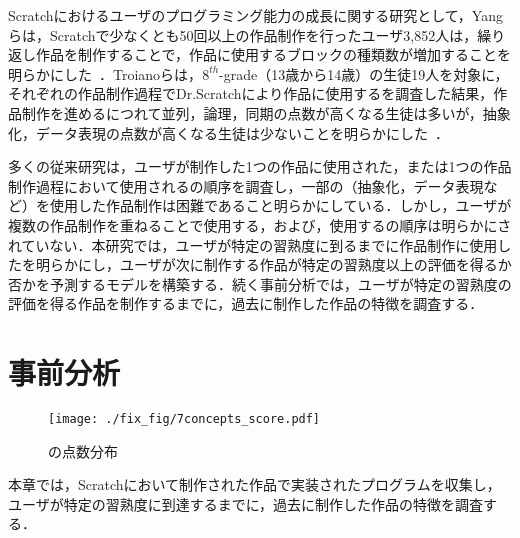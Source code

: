 \documentclass[submit]{ipsj}
\begin{document}
Scratchにおけるユーザのプログラミング能力の成長に関する研究として，Yangらは，Scratchで少なくとも50回以上の作品制作を行ったユーザ3,852人は，繰り返し作品を制作することで，作品に使用するブロックの種類数が増加することを明らかにした~\cite{Yang_2015}．Troianoらは，{$8^{th}$}-grade（13歳から14歳）の生徒19人を対象に，それぞれの作品制作過程でDr.Scratchにより作品に使用する\textcolor{red}{}を調査した結果，作品制作を進めるにつれて並列，論理，同期の点数が高くなる生徒は多いが，抽象化，データ表現の点数が高くなる生徒は少ないことを明らかにした~\cite{Troiano_2019}．

多くの従来研究は，ユーザが制作した1つの作品に使用された\textcolor{red}{}，または1つの作品制作過程において使用される\textcolor{red}{}の順序を調査し，一部の\textcolor{red}{}（抽象化，データ表現など）を使用した作品制作は困難であること明らかにしている．しかし，ユーザが複数の作品制作を重ねることで使用する\textcolor{red}{}，および，使用する\textcolor{red}{}の順序は明らかにされていない．本研究では，ユーザが特定の習熟度に到るまでに作品制作に使用した\textcolor{red}{}を明らかにし，ユーザが次に制作する作品が特定の習熟度以上の評価を得るか否かを予測するモデルを構築する．続く事前分析では，ユーザが特定の習熟度の評価を得る作品を制作するまでに，過去に制作した作品の特徴を調査する．

\section{事前分析}\label{sec:section_3}

\begin{figure*}[t]
    \centering
    \texttt{[image: ./fix\_fig/7concepts\_score.pdf]}
    \caption{\textcolor{red}{}の点数分布}
    \label{fig:7concepts_score}
\end{figure*}

本章では，Scratchにおいて制作された作品で実装されたプログラムを収集し，ユーザが特定の習熟度に到達するまでに，過去に制作した作品の特徴を調査する．

\end{document}
